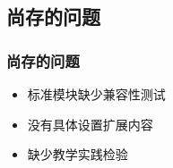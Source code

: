 \documentclass{beamer}
\begin{document}
\subsection{尚存的问题}

\begin{frame}
    \frametitle{尚存的问题}
    \begin{itemize}
        \setlength{\itemsep}{.5cm}
        \item 标准模块缺少兼容性测试
        \item 没有具体设置扩展内容
        \item 缺少教学实践检验
    \end{itemize}
\end{frame}
\end{document}
